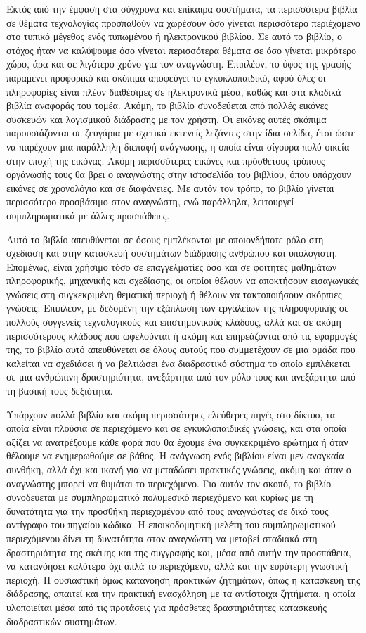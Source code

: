 \documentclass[
]{article}
\begin{document}
Εκτός από την έμφαση στα σύγχρονα και επίκαιρα συστήματα, τα περισσότερα
βιβλία σε θέματα τεχνολογίας προσπαθούν να χωρέσουν όσο γίνεται
περισσότερο περιέχομενο στο τυπικό μέγεθος ενός τυπωμένου ή ηλεκτρονικού
βιβλίου. Σε αυτό το βιβλίο, ο στόχος ήταν να καλύψουμε όσο γίνεται
περισσότερα θέματα σε όσο γίνεται μικρότερο χώρο, άρα και σε λιγότερο
χρόνο για τον αναγνώστη. Επιπλέον, το ύφος της γραφής παραμένει
προφορικό και σκόπιμα αποφεύγει το εγκυκλοπαιδικό, αφού όλες οι
πληροφορίες είναι πλέον διαθέσιμες σε ηλεκτρονικά μέσα, καθώς και στα
κλαδικά βιβλία αναφοράς του τομέα. Ακόμη, το βιβλίο συνοδεύεται από
πολλές εικόνες συσκευών και λογισμικού διάδρασης με τον χρήστη. Οι
εικόνες αυτές σκόπιμα παρουσιάζονται σε ζευγάρια με σχετικά εκτενείς
λεζάντες στην ίδια σελίδα, έτσι ώστε να παρέχουν μια παράλληλη διεπαφή
ανάγνωσης, η οποία είναι σίγουρα πολύ οικεία στην εποχή της εικόνας.
Ακόμη περισσότερες εικόνες και πρόσθετους τρόπους οργάνωσής τους θα βρει
ο αναγνώστης στην ιστοσελίδα του βιβλίου, όπου υπάρχουν εικόνες σε
χρονολόγια και σε διαφάνειες. Με αυτόν τον τρόπο, το βιβλίο γίνεται
περισσότερο προσβάσιμο στον αναγνώστη, ενώ παράλληλα, λειτουργεί
συμπληρωματικά με άλλες προσπάθειες.

Αυτό το βιβλίο απευθύνεται σε όσους εμπλέκονται με οποιονδήποτε ρόλο στη
σχεδιάση και στην κατασκευή συστημάτων διάδρασης ανθρώπου και
υπολογιστή. Επομένως, είναι χρήσιμο τόσο σε επαγγελματίες όσο και σε
φοιτητές μαθημάτων πληροφορικής, μηχανικής και σχεδίασης, οι οποίοι
θέλουν να αποκτήσουν εισαγωγικές γνώσεις στη συγκεκριμένη θεματική
περιοχή ή θέλουν να τακτοποιήσουν σκόρπιες γνώσεις. Επιπλέον, με
δεδομένη την εξάπλωση των εργαλείων της πληροφορικής σε πολλούς
συγγενείς τεχνολογικούς και επιστημονικούς κλάδους, αλλά και σε ακόμη
περισσότερους κλάδους που ωφελούνται ή ακόμη και επηρεάζονται από τις
εφαρμογές της, το βιβλίο αυτό απευθύνεται σε όλους αυτούς που
συμμετέχουν σε μια ομάδα που καλείται να σχεδιάσει ή να βελτιώσει ένα
διαδραστικό σύστημα το οποίο εμπλέκεται σε μια ανθρώπινη δραστηριότητα,
ανεξάρτητα από τον ρόλο τους και ανεξάρτητα από τη βασική τους
δεξιότητα.

Υπάρχουν πολλά βιβλία και ακόμη περισσότερες ελεύθερες πηγές στο δίκτυο,
τα οποία είναι πλούσια σε περιεχόμενο και σε εγκυκλοπαιδικές γνώσεις,
και στα οποία αξίζει να ανατρέξουμε κάθε φορά που θα έχουμε ένα
συγκεκριμένο ερώτημα ή όταν θέλουμε να ενημερωθούμε σε βάθος. Η ανάγνωση
ενός βιβλίου είναι μεν αναγκαία συνθήκη, αλλά όχι και ικανή για να
μεταδώσει πρακτικές γνώσεις, ακόμη και όταν ο αναγνώστης μπορεί να
θυμάται το περιεχόμενο. Για αυτόν τον σκοπό, το βιβλίο συνοδεύεται με
συμπληρωματικό πολυμεσικό περιεχόμενο και κυρίως με τη δυνατότητα για
την προσθήκη περιεχομένου από τους αναγνώστες σε δικό τους αντίγραφο του
πηγαίου κώδικα. Η εποικοδομητική μελέτη του συμπληρωματικού περιεχόμενου
δίνει τη δυνατότητα στον αναγνώστη να μεταβεί σταδιακά στη δραστηριότητα
της σκέψης και της συγγραφής και, μέσα από αυτήν την προσπάθεια, να
κατανόησει καλύτερα όχι απλά το περιεχόμενο, αλλά και την ευρύτερη
γνωστική περιοχή. Η ουσιαστική όμως κατανόηση πρακτικών ζητημάτων, όπως
η κατασκευή της διάδρασης, απαιτεί και την πρακτική ενασχόληση με τα
αντίστοιχα ζητήματα, η οποία υλοποιείται μέσα από τις προτάσεις για
πρόσθετες δραστηριότητες κατασκευής διαδραστικών συστημάτων.
\end{document}
